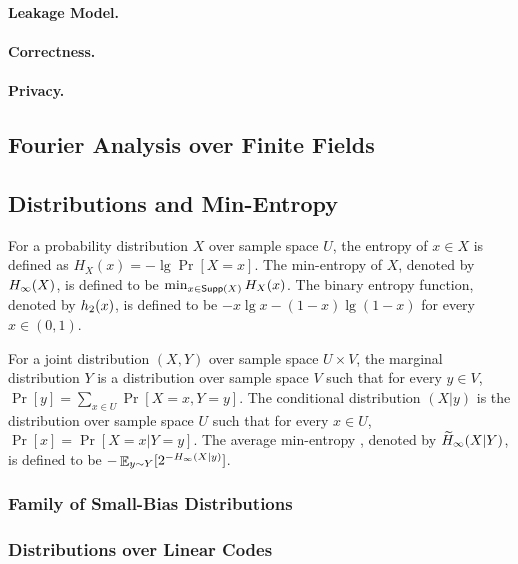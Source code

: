 \paragraph{Leakage Model.}

\paragraph{Correctness.}

\paragraph{Privacy.}

\subsection{Fourier Analysis over Finite Fields}\label{sec:prelim-fourier}

\subsection{Distributions and Min-Entropy}\label{sec:prelim-min-ent}
For a probability distribution $X$ over sample space $U$, the entropy of $x \in X$ is defined as $H_X(x) = -\lg\Pr[X = x]$.
The min-entropy of $X$, denoted by $H_\infty(X)$, is defined to be $\min_{x \in \mathsf{Supp}(X)} H_X(x)$.
The binary entropy function, denoted by $h_2(x)$, is defined to be $-x \lg x - (1-x) \lg(1-x)$ for every $x \in (0,1)$.

For a joint distribution $(X,Y)$ over sample space $U \times V$, the marginal distribution $Y$ is a distribution over sample space $V$ such that for every $y \in V$, $\Pr[y] = \sum_{x \in U} \Pr[X = x, Y = y]$.
The conditional distribution $(X|y)$ is the distribution over sample space $U$ such that for every $x \in U$, $\Pr[x] = \Pr[X = x | Y = y]$.
The average min-entropy \cite{DORS08}, denoted by $\widetilde{H}_\infty(X|Y)$, is defined to be $-\mathop{{\mathbb E}}_{y \sim Y}[2^{-H_\infty(X|y)}]$.

\subsubsection{Family of Small-Bias Distributions}\label{sec:prelim-small-bias}

\subsubsection{Distributions over Linear Codes}\label{sec:prelim-codes}





